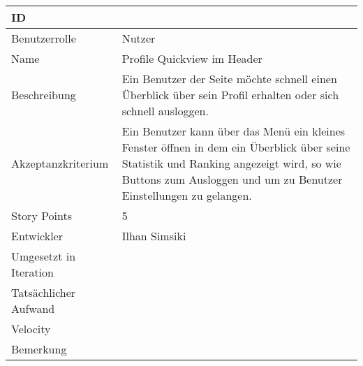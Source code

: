 \begin{tabularx}{\textwidth}{|p{}|X|}
	\hline
	ID & \\
	\hline
	Benutzerrolle & Nutzer\\
	\hline
	Name & Profile Quickview im Header\\
	\hline
	Beschreibung & Ein Benutzer der Seite möchte schnell einen Überblick über sein Profil erhalten oder sich schnell ausloggen.\\
	\hline
	Akzeptanzkriterium & Ein Benutzer kann über das Menü ein kleines Fenster öffnen in dem ein Überblick über seine Statistik und Ranking angezeigt wird, so wie Buttons zum Ausloggen und um zu Benutzer Einstellungen zu gelangen.\\
	\hline
	Story Points & 5\\
	\hline
	Entwickler & Ilhan Simsiki\\
	\hline
	Umgesetzt in Iteration & \\
	\hline
	Tatsächlicher Aufwand & \\
	\hline
	Velocity & \\
	\hline
	Bemerkung & \\
	\hline
\end{tabularx}
\vspace{20pt}
